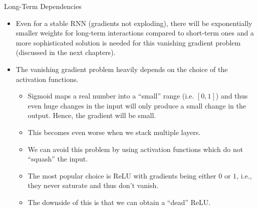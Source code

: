 \begin{vbframe}{Long-Term Dependencies}
  \begin{itemize}
    \item Even for a stable RNN (gradients not exploding), there will be exponentially smaller weights for long-term interactions compared to short-term ones and a more sophisticated solution is needed for this vanishing gradient problem (discussed in the next chapters).
    \item The {vanishing gradient problem} heavily depends on the choice of the activation functions.
    \begin{itemize} 
      \item Sigmoid maps a real number into a \enquote{small} range (i.e. $[0, 1]$) and thus even huge changes in the input will only produce a small change in the output. Hence, the gradient will be small.
      \item This becomes even worse when we stack multiple layers.
      \item We can avoid this problem by using activation functions which do not \enquote{squash} the input.
      \item The most popular choice is ReLU with gradients being either $0$ or $1$, i.e., they never saturate and thus don't vanish.
      \item The downside of this is that we can obtain a \enquote{dead} ReLU.
    \end{itemize}

  \end{itemize}


\end{vbframe}

\endlecture
